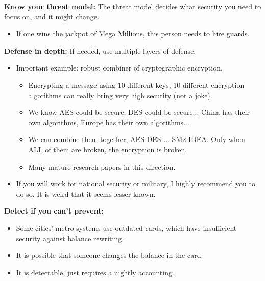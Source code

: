 \documentclass{article}
\newcommand{\parhead}[1]{\noindent \textbf{#1}}
\begin{document}
\smallskip\parhead{Know your threat model:} The threat model decides what security you need to focus on, and it might change.
\begin{itemize}
    \item If one wins the jackpot of Mega Millions, this person needs to hire guards.
\end{itemize}

\newpage
\smallskip\parhead{Defense in depth:} If needed, use multiple layers of defense.
\begin{itemize}
    \item Important example: robust combiner of cryptographic encryption.
    \begin{itemize}
        \item Encrypting a message using 10 different keys, 10 different encryption algorithms can really bring very high security (not a joke).
        
        \item We know AES could be secure, DES could be secure... China has their own algorithms, Europe has their own algorithms...
        
        \item We can combine them together, AES-DES-...-SM2-IDEA. Only when ALL of them are broken, the encryption is broken.
        
        \item Many mature research papers in this direction.
    \end{itemize}
    
    \item If you will work for national security or military, I highly recommend you to do so. It is weird that it seems lesser-known.
\end{itemize}

\smallskip\parhead{Detect if you can’t prevent:}
\begin{itemize}
    \item Some cities' metro systems use outdated cards, which have insufficient security against balance rewriting.
    
    \item It is possible that someone changes the balance in the card.
    
    \item It is detectable, just requires a nightly accounting.
\end{itemize}
\end{document}
